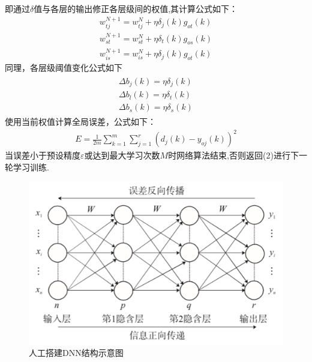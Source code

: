 \documentclass{whutmod}
\begin{document}
\begin{itemize}
	即通过$\delta$值与各层的输出修正各层级间的权值,其计算公式如下：
	\begin{gather*}
	w _ { t j } ^ { N + 1 } = w _ { t j } ^ { N } + \eta \delta _ { j } ( k ) g _ { o t } ( k )\\
	w _ { s t } ^ { N + 1 } = w _ { s t } ^ { N } + \eta \delta _ { t } ( k ) g _ { o s } ( k )\\
	w _ { i s } ^ { N + 1 } = w _ { i s } ^ { N } + \eta \delta _ { j } ( k ) g _ { o t } ( k )
	\end{gather*}
	同理，各层级阈值变化公式如下
	\begin{gather*}
	\begin{array} { l } { \Delta b _ { j } ( k ) = \eta \delta _ { j } ( k ) } \\ { \Delta b _ { l } ( k ) = \eta \delta _ { t } ( k ) } \\ { \Delta b _ { s } ( k ) = \eta \delta _ { s } ( k ) } \end{array}
	\end{gather*}
	使用当前权值计算全局误差，公式如下：
	\begin{gather*}
	E = \frac { 1 } { 2 m } \sum _ { k = 1 } ^ { m } \sum _ { j = 1 } ^ { r } \left( d _ { j } ( k ) - y _ { o j } ( k ) \right) ^ { 2 }
	\end{gather*}
	当误差小于预设精度$\varepsilon $或达到最大学习次数$M$时网络算法结束,否则返回(2)进行下一轮学习训练.
		\end{itemize}
	
		\begin{figure}[H]
		\centering
		\includegraphics[width=\textwidth]{figures/123546.png}
		\caption{人工搭建DNN结构示意图}\label{dnn}
	\end{figure}
	
\end{document}
